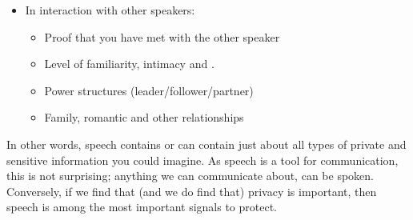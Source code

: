 \documentclass[letterpaper,10pt,english]{jupyterBook}
\begin{document}
\begin{itemize}
\begin{itemize}
\item {} 
\sphinxAtStartPar
Association and affiliation with reference groups, including
groups of gender\sphinxhyphen{}identity, ethnicity, culture background,
geographic background, nationality, political and religious
affiliations etc.

\end{itemize}

\item {} 
\sphinxAtStartPar
In interaction with other speakers:
\begin{itemize}
\item {} 
\sphinxAtStartPar
Proof that you have met with the other speaker

\item {} 
\sphinxAtStartPar
Level of familiarity, intimacy and
.

\item {} 
\sphinxAtStartPar
Power structures (leader/follower/partner)

\item {} 
\sphinxAtStartPar
Family, romantic and other relationships

\end{itemize}

\end{itemize}

\sphinxAtStartPar
In other words, speech contains or can contain just about all types of
private and sensitive information you could imagine. As speech is a tool
for communication, this is not surprising; anything we can communicate
about, can be spoken. Conversely, if we find that (and we do find that)
privacy is important, then speech is among the most important signals to
protect.
\end{document}
